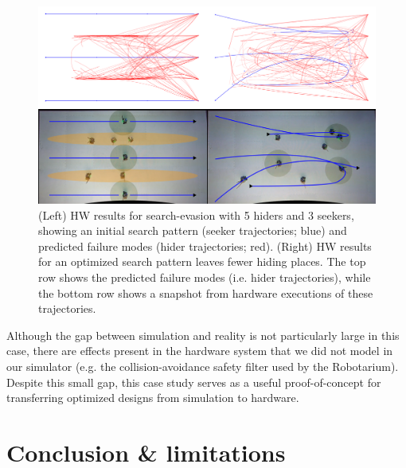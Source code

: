 \begin{figure}[tb]
    \centering
    \includegraphics[width=\linewidth]{images/corl/hw_results.png}
    \caption{(Left) HW results for search-evasion with 5 hiders and 3 seekers, showing an initial search pattern (seeker trajectories; blue) and predicted failure modes (hider trajectories; red). (Right) HW results for an optimized search pattern leaves fewer hiding places. The top row shows the predicted failure modes (i.e. hider trajectories), while the bottom row shows a snapshot from hardware executions of these trajectories.}
    \label{fig:hw_experimental_results}
\end{figure}

Although the gap between simulation and reality is not particularly large in this case, there are effects present in the hardware system that we did not model in our simulator (e.g. the collision-avoidance safety filter used by the Robotarium). Despite this small gap, this case study serves as a useful proof-of-concept for transferring optimized designs from simulation to hardware.
%



\section{Conclusion \& limitations}

